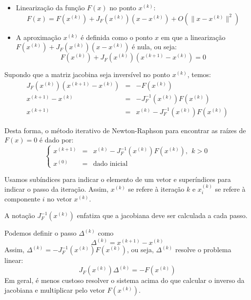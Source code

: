 \begin{itemize}
\item Linearização da função $F(x)$ no ponto $x^{(k)}$:
  \begin{equation}
F(x)= F(x^{(k)})+ J_F\left(x^{(k)}\right) \left(x-x^{(k)}\right)  + O\left(\|x-x^{(k)}\|^2\right)
  \end{equation}
\item A aproximação $x^{(k)}$ é definida como o ponto $x$ em que a linearização $F(x^{(k)})+ J_F\left(x^{(k)}\right) \left(x-x^{(k)}\right)$ é nula, ou seja:
\begin{equation} F(x^{(k)})+ J_F\left(x^{(k)}\right) \left(x^{(k+1)}-x^{(k)}\right)=0 \end{equation}
\end{itemize}

Supondo que a matriz jacobina seja inversível no ponto $x^{(k)}$, temos:
\begin{eqnarray}
J_F\left(x^{(k)}\right) \left(x^{(k+1)}-x^{(k)}\right)&=&-F(x^{(k)})\\
x^{(k+1)}-x^{(k)}&=&-J_F^{-1}\left(x^{(k)}\right)F(x^{(k)})\\
x^{(k+1)}&=&x^{(k)}-J_F^{-1}\left(x^{(k)}\right)F(x^{(k)})
\end{eqnarray}

Desta forma, o método iterativo de Newton-Raphson para encontrar as raízes de $F(x)=0$ é dado por:
\begin{equation}
\left\{\begin{array}{rcl}
x^{(k+1)} &=& x^{(k)}-J_F^{-1}\left(x^{(k)}\right)F(x^{(k)}),~~ k> 0\\
x^{(0)}&=&\text{dado inicial}
\end{array}\right.
\end{equation}

\begin{obs} Usamos subíndices para indicar o elemento de um vetor e superíndices para indicar o passo da iteração. Assim, $x^{(k)}$ se refere à iteração $k$ e $x_i^{(k)}$ se refere à componente $i$ no vetor $x^{(k)}$.
\end{obs}
\begin{obs} A notação $J_F^{-1}\left(x^{(k)}\right)$ enfatiza que a jacobiana deve ser calculada a cada passo.
\end{obs}
\begin{obs} Podemos definir o passo $\Delta^{(k)}$ como
\begin{equation} \Delta^{(k)}= x^{(k+1)}-x^{(k)} \end{equation}
Assim, $\Delta^{(k)}=-J_F^{-1}\left(x^{(k)}\right)F(x^{(k)})$, ou seja, $\Delta^{(k)}$ resolve o problema linear:
\begin{equation} J_F\left(x^{(k)}\right)\Delta^{(k)}= - F(x^{(k)}) \end{equation}
Em geral, é menos custoso resolver o sistema acima do que calcular o inverso da jacobiana e multiplicar pelo vetor $F(x^{(k)})$.
\end{obs}

